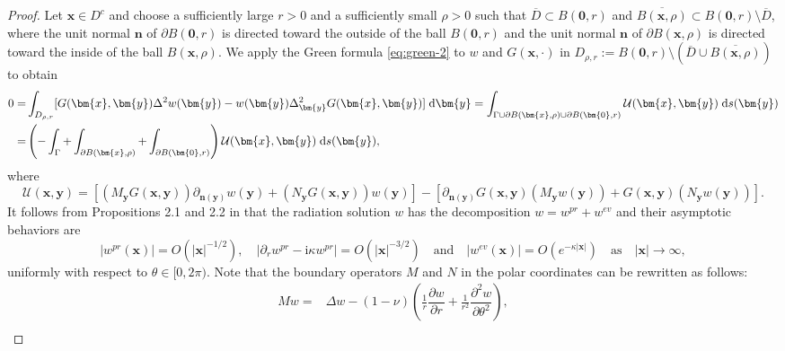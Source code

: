 \documentclass[10pt,a4paper]{article}
\numberwithin{equation}{section}
\begin{document}
\begin{proof}
  Let $\bm{ x }\in D^c$ and choose a sufficiently large $r>0$ and a sufficiently small $\rho>0$ such that $\overline{D}\subset B(\bm{ 0 },r)$ and $\overline{B(\bm{ x },\rho)}\subset B(\bm{ 0 },r)\setminus \overline{D}$, where
  the unit normal $\bm{ n }$ of $\partial B(\bm{ 0 },r)$  is directed toward the outside of the ball  $B(\bm{ 0 },r)$
  and  the unit normal $\bm{ n }$ of  $\partial B(\bm{ x},\rho)$   is directed toward the inside of the ball  $B(\bm{ x },\rho)$.  
    We apply the Green formula \eqref{eq:green-2} to $w$ and $G(\bm{ x },\cdot)$  in $D_{\rho,r}:=B(\bm{ 0 },r)\setminus (\overline{D}\cup \overline{B(\bm{ x },\rho)})$ to obtain 
  \begin{align} \notag
    0 = & \int_{ D_{\rho,r}  } [G(\bm{ x }, \bm{ y }) \Delta^2 w(\bm{ y })
          - w (\bm{ y })  \Delta^2_{\bm{ y }}  G(\bm{ x }, \bm{ y })]
          \;\mathrm{d}\bm{ y } %
    =  \int_{ \Gamma \cup \partial B(\bm{ x },\rho)\cup \partial B(\bm{ 0 },r) }
        \mathcal{U}(\bm{ x },\bm{ y }) \;\mathrm{d}s(\bm{ y })\\
    \label{eq:greendr}
    = & \left( -\int_{ \Gamma} +\int_{ \partial B(\bm{ x },\rho)} + \int_{\partial B(\bm{ 0 },r) }\right)
        \mathcal{U}(\bm{ x },\bm{ y }) \;\mathrm{d}s(\bm{ y }),
  \end{align}
  where $$\mathcal{U}(\bm{ x },\bm{ y })
  =\left[ (M_{\bm{ y }}G(\bm{ x }, \bm{ y }))\partial_{\bm{n}(\bm{ y }) } w(\bm{ y })
    + (N_{\bm{ y }}G(\bm{ x }, \bm{ y }) ) w(\bm{ y }) \right]
  - \left[\partial_{\bm{n}(\bm{ y }) } G(\bm{ x }, \bm{ y }) (M_{\bm{ y }}w(\bm{ y }))  +  G(\bm{ x }, \bm{ y }) (N_{\bm{ y }}w(\bm{ y })) \right].$$
  It follows from Propositions 2.1 and 2.2 in \cite{bourgeois_well_2020} that the radiation solution $w$ has the decomposition $w=w^{pr}+w^{ev}$ and their asymptotic behaviors are
  \begin{equation*}
    |w^{pr}(\bm{ x })|=O(| \bm{ x } | ^{-1/2}),\quad
    |\partial_rw^{pr}-\mathrm{ i } \kappa w^{pr}|=O(| \bm{ x } |^{-3/2})\quad
    \mathrm{ and } \quad | w^{ev}(\bm{ x }) | = O(e^{-\kappa | \bm{ x } |}) \quad  \mathrm{as}\quad | \bm{ x } |\to \infty,
  \end{equation*}
  uniformly with respect to $\theta \in [0,2\pi)$. 
  Note that the boundary operators $M$ and $N$ in the polar coordinates can be rewritten as follows:
  \begin{align}
    \label{eq:Mpolar}
  Mw  = & \Delta w - (1-\nu)\left( \frac{1}{r} \dfrac{\partial w}{\partial r} + \frac{1}{r^{2}} \dfrac{\partial^2 w}{\partial \theta^2}\right),   \\

\end{align}
\end{proof}
\end{document}
